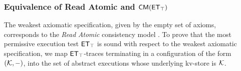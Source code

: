 
\subsubsection{Equivalence of Read Atomic and $\CMs(\ET_{\top})$} 
The weakest axiomatic specification, given by the empty set of 
axioms, corresponds to the \emph{Read Atomic} consistency model \cite{ramp}. 
To prove that the most permissive execution test $\mathsf{ET}_{\top}$ is sound with 
respect to the weakest axiomatic specification, we map $\mathsf{ET}_{\top}$-traces 
terminating in a configuration of the form $(\mathcal{K}, -)$, into the set of 
abstract executions whose underlying kv-store is $\mathcal{K}$. 


